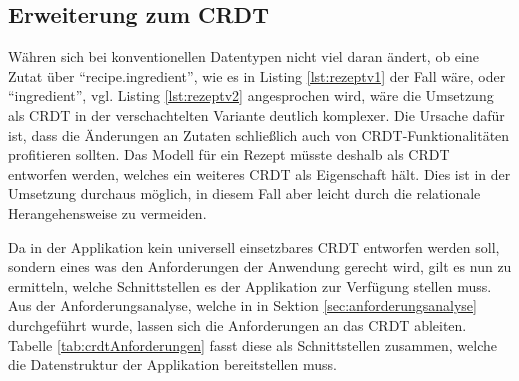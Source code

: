 \documentclass[a4paper, 12pt]{scrreprt}
\begin{document}
\begin{minipage}{\linewidth}

\end{minipage}

\subsection{Erweiterung zum CRDT}
\label{sec:erweiterungCRDT}
Währen sich bei konventionellen Datentypen nicht viel daran ändert, ob eine Zutat über \enquote{recipe.ingredient}, wie es in Listing \ref{lst:rezeptv1} der Fall wäre, oder \enquote{ingredient}, vgl. Listing \ref{lst:rezeptv2} angesprochen wird, wäre die Umsetzung als CRDT in der verschachtelten Variante deutlich komplexer. Die Ursache dafür ist, dass die Änderungen an Zutaten schließlich auch von CRDT-Funktionalitäten profitieren sollten. Das Modell für ein Rezept müsste deshalb als CRDT entworfen werden, welches ein weiteres CRDT als Eigenschaft hält. Dies ist in der Umsetzung durchaus möglich, in diesem Fall aber leicht durch die relationale Herangehensweise zu vermeiden.

Da in der Applikation kein universell einsetzbares CRDT entworfen werden soll, sondern eines was den Anforderungen der Anwendung gerecht wird, gilt es nun zu ermitteln, welche Schnittstellen es der Applikation zur Verfügung stellen muss. Aus der Anforderungsanalyse, welche in in Sektion \ref{sec:anforderungsanalyse} durchgeführt wurde, lassen sich die Anforderungen an das CRDT ableiten. Tabelle \ref{tab:crdtAnforderungen} fasst diese als Schnittstellen zusammen, welche die Datenstruktur der Applikation bereitstellen muss. 
\end{document}
